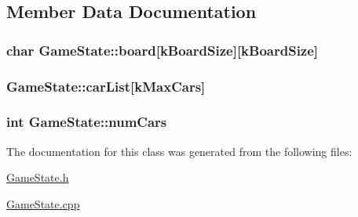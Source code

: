 \subsection{\-Member \-Data \-Documentation}
\hypertarget{class_game_state_a976fdcb0a9fc1075c7ff2c4878cf327b}{
\subsubsection[{board}]{\setlength{\rightskip}{0pt plus 5cm}char {\bf \-Game\-State\-::board}\mbox{[}{\bf k\-Board\-Size}\mbox{]}\mbox{[}{\bf k\-Board\-Size}\mbox{]}}}\label{class_game_state_a976fdcb0a9fc1075c7ff2c4878cf327b}
\hypertarget{class_game_state_ac4ada0f89105131dbb7ba05cf9c41d50}{
\subsubsection[{car\-List}]{ {\bf \-Game\-State\-::car\-List}\mbox{[}{\bf k\-Max\-Cars}\mbox{]}}}\label{class_game_state_ac4ada0f89105131dbb7ba05cf9c41d50}
\hypertarget{class_game_state_ac72c2bdf594d29f3dcbb46d1544f392d}{
\subsubsection[{num\-Cars}]{\setlength{\rightskip}{0pt plus 5cm}int {\bf \-Game\-State\-::num\-Cars}}}\label{class_game_state_ac72c2bdf594d29f3dcbb46d1544f392d}


\-The documentation for this class was generated from the following files\-:\begin{DoxyCompactItemize}
\item 
\hyperlink{_game_state_8h}{\-Game\-State.\-h}\item 
\hyperlink{_game_state_8cpp}{\-Game\-State.\-cpp}\end{DoxyCompactItemize}
